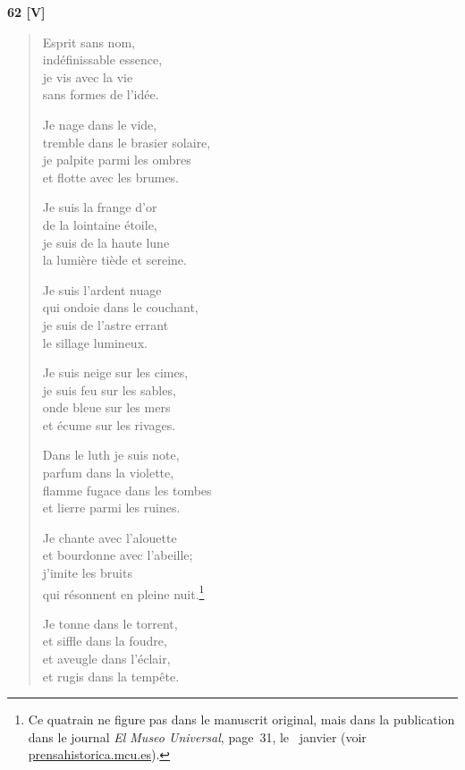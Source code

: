 
\begin{center}
  \textbf{62 [V]}
\end{center}

\begin{verse}
  Esprit sans nom, \\
  indéfinissable essence, \\
  je vis avec la vie \\
  sans formes de l'idée.

  Je nage dans le vide, \\
  tremble dans le brasier solaire, \\
  je palpite parmi les ombres \\
  et flotte avec les brumes.

  Je suis la frange d'or \\
  de la lointaine étoile, \\
  je suis de la haute lune \\
  la lumière tiède et sereine.

  Je suis l'ardent nuage \\
  qui ondoie dans le couchant, \\
  je suis de l'astre errant \\
  le sillage lumineux.

  Je suis neige sur les cimes, \\
  je suis feu sur les sables, \\
  onde bleue sur les mers \\
  et écume sur les rivages.

  Dans le luth je suis note, \\
  parfum dans la violette, \\
  flamme fugace dans les tombes \\
  et lierre parmi les ruines.

  Je chante avec l'alouette \\
  et bourdonne avec l'abeille; \\
  j'imite les bruits \\
  qui résonnent en pleine nuit.\footnote{Ce quatrain ne
figure pas dans le manuscrit original, mais dans la publication dans
le journal \emph{El Museo Universal}, page~31, le~
janvier  (voir \url{prensahistorica.mcu.es}).}

  Je tonne dans le torrent, \\
  et siffle dans la foudre, \\
  et aveugle dans l'éclair, \\
  et rugis dans la tempête.


\end{verse}
